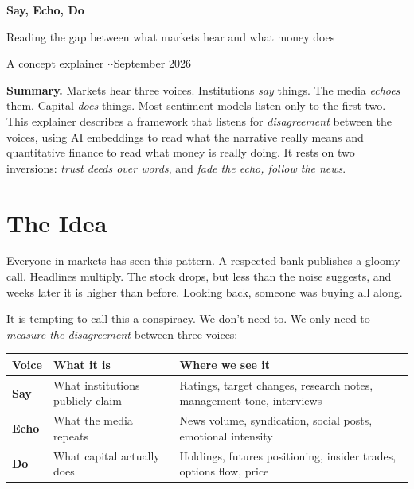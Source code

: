 \documentclass[11pt,a4paper]{article}
\newcommand{\SAY}{\textcolor{say}{\textbf{Say}}}
\newcommand{\ECHO}{\textcolor{echo}{\textbf{Echo}}}
\newcommand{\DO}{\textcolor{do}{\textbf{Do}}}
\begin{document}
\begin{center}
{\Huge\bfseries \textcolor{say}{Say}, \textcolor{echo}{Echo}, \textcolor{do}{Do}\par}
\vspace{4pt}
{\large Reading the gap between what markets hear and what money does\par}
\vspace{6pt}
{\normalsize A concept explainer \quad$\cdot$ \quad$\cdot$\quad September 2026\par}
\end{center}

\vspace{4pt}
\begin{tcolorbox}[enhanced,colback=gray!4,colframe=gray!40,boxrule=0.4pt,arc=2pt,left=10pt,right=10pt]
\small
\textbf{Summary.} Markets hear three voices. Institutions \emph{say} things. The media \emph{echoes} them. Capital \emph{does} things. Most sentiment models listen only to the first two. This explainer describes a framework that listens for \emph{disagreement} between the voices, using AI embeddings to read what the narrative really means and quantitative finance to read what money is really doing. It rests on two inversions: \emph{trust deeds over words}, and \emph{fade the echo, follow the news}.
\end{tcolorbox}

\section{The Idea}

Everyone in markets has seen this pattern. A respected bank publishes a gloomy call. Headlines multiply. The stock drops, but less than the noise suggests, and weeks later it is higher than before. Looking back, someone was buying all along.

It is tempting to call this a conspiracy. We don't need to. We only need to \emph{measure the disagreement} between three voices:

\begin{center}
\small
\begin{tabular}{@{}>{\raggedright}p{1.6cm}>{\raggedright}p{4.8cm}>{\raggedright\arraybackslash}p{6.8cm}@{}}
\toprule
Voice & What it is & Where we see it \\
\midrule
\SAY & What institutions publicly claim & Ratings, target changes, research notes, management tone, interviews \\
\ECHO & What the media repeats & News volume, syndication, social posts, emotional intensity \\
\DO & What capital actually does & Holdings, futures positioning, insider trades, options flow, price \\
\bottomrule
\end{tabular}
\end{center}
\end{document}
